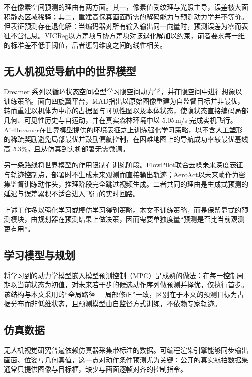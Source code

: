 \documentclass[12pt,a4paper]{ctexart}
\let\origcite\cite
\renewcommand{\cite}[2][]{\nobreak\mbox{\origcite[#1]{#2}}}
\begin{document}
不在像素空间预测的理由有两方面。其一，像素值受纹理与光照主导，误差被大面积静态区域稀释；其二，重建高保真画面所需的解码能力与预测动力学并不等价。但表征预测存在退化解：当编码器对所有输入输出同一向量时，预测误差为零而表征不含信息。VICReg\cite{bardes2022vicreg}以方差项与协方差项对该退化解加以约束，前者要求每一维的标准差不低于阈值，后者惩罚维度之间的线性相关。

\subsection{无人机视觉导航中的世界模型}
Dreamer 系列以循环状态空间模型学习隐空间动力学，并在隐空间中进行想象以训练策略\cite{hafner2024dreamerv3,hafner2020dreamer}。面向四旋翼平台，MAD\cite{liu2026mad}指出以原始图像重建为自监督目标并非最优，转而重建以机体为中心的占据图与可见性图以及本体状态，使隐状态直接编码局部几何、可见性历史与自运动，并在真实森林环境中以 5.05\,m/s 完成实机飞行。AirDreamer\cite{liu2026airdreamer}在世界模型提供的环境表征之上训练强化学习策略，以不含人工塑形的稀疏奖励避免局部最优并鼓励偏航控制，在困难地图上的导航成功率较最优基线高 5.3\%，且从仿真到实机部署无需微调。

另一条路线将世界模型的作用限制在训练阶段。FlowPilot\cite{flowpilot2026}联合去噪未来深度表征与轨迹控制点，部署时不生成未来观测而直接输出轨迹；AeroAct\cite{aeroact2026}以未来帧作为密集监督训练动作头，推理阶段完全跳过视频生成。二者共同的理由是生成式预测的延迟与误差累积不适合进入飞行的实时回路。

上述工作多以强化学习或模仿学习得到策略。本文不训练策略，而是保留显式的预测模块，由规划器在预测结果上做决策，因而需要单独度量``预测是否比当前观测更有用''。

\subsection{学习模型与规划}
将学习到的动力学模型嵌入模型预测控制（MPC）是成熟的做法\cite{nagabandi2018neural,chua2018pets}：在每一控制周期以当前状态为初值，对未来若干步的候选动作序列做预测并择优，仅执行首步。该结构与本文采用的``全局路径 + 局部修正''一致，区别在于本文的预测目标为占据分布而非低维状态，且预测模型由自监督方式训练，不依赖专家轨迹。

\subsection{仿真数据}
无人机视觉研究普遍依赖仿真器采集带标注的数据\cite{shah2018airsim}。可编程渲染引擎能够同步输出画面、位姿与几何真值，这一点对动作条件预测尤为关键：公开的真实航拍数据集通常只提供图像与目标框，缺少与画面逐帧对齐的控制指令。
\end{document}
